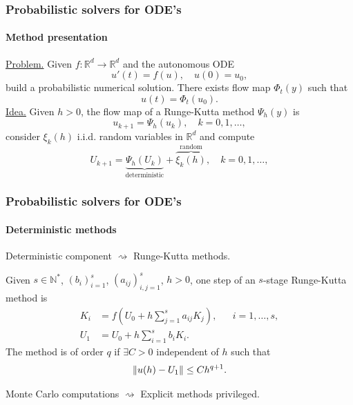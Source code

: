 \documentclass{beamer}
\newcommand{\N}{\mathbb{N}}
\newcommand{\R}{\mathbb{R}}
\newcommand{\sksum}{\textstyle\sum}
\begin{document}
\begin{frame}
	\frametitle{Probabilistic solvers for ODE's}
	\framesubtitle{Method presentation \cite{CGS16}}
	
	\underline{Problem.} Given $f\colon\R^d\to\R^d$ and the autonomous ODE 
	\begin{equation*}
		u'(t) = f(u), \quad	u(0) = u_0, 
	\end{equation*}
	build a probabilistic numerical solution. There exists flow map $\Phi_t(y)$ such that
	\begin{equation*}
		u(t) = \Phi_t(u_0).
	\end{equation*}
	\underline{Idea.} Given $h > 0$, the flow map of a Runge-Kutta method $\Psi_h(y)$ is
	\begin{equation*}
		u_{k+1} = \Psi_h(u_k), \quad k = 0, 1, \ldots,
	\end{equation*}
	consider $\xi_k(h)$ i.i.d. random variables in $\R^d$ and compute
	\begin{equation*}
		U_{k+1} = \underbrace{\Psi_h(U_k)}_{\text{deterministic}} + \overbrace{\xi_k(h)}^{\text{random}}, \quad k = 0, 1, \ldots,
	\end{equation*}
	
\end{frame}

\begin{frame}
	\frametitle{Probabilistic solvers for ODE's}
	\framesubtitle{Deterministic methods \cite{HLW02}}
	
	Deterministic component $\rightsquigarrow$ Runge-Kutta methods.
	\begin{definition}\label{def:RK} Given $s \in \N^*$, $(b_i)_{i=1}^s$, $(a_{ij})_{i,j=1}^s$, $h > 0$, one step of an $s$-stage Runge-Kutta method is 
		\begin{equation*}
		\begin{aligned}
		K_i &= f(U_0 + h\sksum_{j=1}^s a_{ij}K_j), && i = 1, \ldots, s, \\
		U_1 &= U_0 + h \sksum_{i=1}^s b_i K_i.
		\end{aligned}
		\end{equation*}
		The method is of order $q$ if $\exists C > 0$ independent of $h$ such that
		\begin{equation*}
			\norm{u(h)-U_1} \leq Ch^{q+1}.
		\end{equation*}
	\end{definition}
	Monte Carlo computations $\rightsquigarrow$ Explicit methods privileged.
	
\end{frame}
\end{document}
